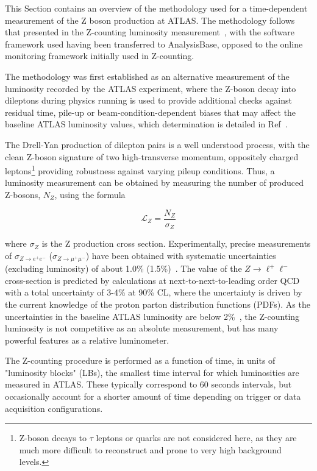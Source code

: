 This Section contains an overview of the methodology used for a time-dependent measurement of the Z boson production at ATLAS. The methodology follows that presented in the Z-counting luminosity measurement~\cite{ATL-DAPR-PUB-2021-001}, with the software framework used having been transferred to AnalysisBase, opposed to the online monitoring framework initially used in Z-counting.

The methodology was first established as an alternative measurement of the luminosity recorded by the ATLAS experiment, where the Z-boson decay into dileptons during physics running is used to provide additional checks against residual time, pile-up or beam-condition-dependent biases that may affect the baseline ATLAS luminosity values, which determination is detailed in Ref~\cite{ATLAS-CONF-2019-021}.

The Drell-Yan production of dilepton pairs is a well understood process, with the clean Z-boson signature of two high-transverse momentum, oppositely charged leptons\footnote{Z-boson decays to $\tau$ leptons or quarks are not considered here, as they are much more difficult to reconstruct and prone to very high background levels.} providing robustness against varying pileup conditions. Thus, a luminosity measurement can be obtained by measuring the number of produced Z-bosons, $N_Z$, using the formula

\begin{equation}
\mathcal{L}_Z = \frac{N_Z}{\sigma_Z}
\label{eq:Zcount:RawLumi_app}
\end{equation}

where $\sigma_Z$ is the Z production cross section. Experimentally, precise measurements of $\sigma_{Z\rightarrow e^+e^-}$ ($\sigma_{Z\rightarrow \mu^+\mu^-}$) have been obtained with systematic uncertainties (excluding luminosity) of about 1.0\% (1.5\%)~\cite{ATLAS:2019zci}. The value of the $Z\rightarrow \ell^+\ell^-$ cross-section is predicted by calculations at next-to-next-to-leading order QCD with a total uncertainty of 3-4\% at 90\% CL, where the uncertainty is driven by the current knowledge of the proton parton distribution functions (PDFs). As the uncertainties in the baseline ATLAS luminosity are below 2\%~\cite{ATLAS-CONF-2019-021}, the Z-counting luminosity is not competitive as an absolute measurement, but has many powerful features as a relative luminometer.

The Z-counting procedure is performed as a function of time, in units of "luminosity blocks" (LBs), the smallest time interval for which luminosities are measured in ATLAS. These typically correspond to 60 seconds intervals, but occasionally account for a shorter amount of time depending on trigger or data acquisition configurations.

